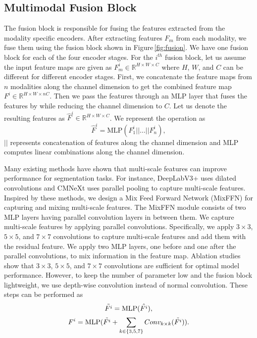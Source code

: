 \documentclass{article}
\begin{document}
\subsection{Multimodal Fusion Block}
The fusion block is responsible for fusing the features extracted from the modality specific encoders. After extracting features $F_{m}$ from each modality, we fuse them using the fusion block shown in Figure\,\ref{fig:fusion}. We have one fusion block for each of the four encoder stages. For the $i^{th}$ fusion block, let us assume the input feature maps are given as $F_m^i \in \mathbb{R}^{H \times W \times C}$ where $H$, $W$, and $C$ can be different for different encoder stages. First, we concatenate the feature maps from $n$ modalities along the channel dimension to get the combined feature map $F^i \in \mathbb{R}^{H \times W \times nC}$. Then we pass the features through an MLP layer that fuses the features by while reducing the channel dimension to $C$. Let us denote the resulting features as $\hat{F}^i \in \mathbb{R}^{H \times W \times C}$. We represent the operation as 
\begin{equation}\label{eq:cat-mlp}
    \hat{F}^i = \text{MLP}(F_1^i || \ldots || F_n^i),
\end{equation}
$||$ represents concatenation of features along the channel dimension and MLP computes linear combinations along the channel dimension. 

Many existing methods have shown that multi-scale features can improve performance for segmentation tasks. For instance, DeepLabV3+ \cite{chen2018deeplabv3+} uses dilated convolutions and CMNeXt \cite{zhang2023CMNext} uses parallel pooling to capture multi-scale features. Inspired by these methods, we design a Mix Feed Forward Network (MixFFN) for capturing and mixing multi-scale features. The MixFFN module consists of two MLP layers having parallel convolution layers in between them. We capture multi-scale features by applying parallel convolutions. Specifically, we apply $3\times 3$, $5\times 5$, and $7\times 7$ convolutions to capture multi-scale features and add them with the residual feature. We apply two MLP layers, one before and one after the parallel convolutions, to mix information in the feature map. Ablation studies show that $3\times 3$, $5\times 5$, and $7\times 7$  convolutions are sufficient for optimal model performance. However, to keep the number of parameter low and the fusion block lightweight, we use depth-wise convolution instead of normal convolution. These steps can be performed as 
\begin{equation}\label{eq:mix-mlp-1}
    \Tilde{F^i} = \text{MLP}(\hat{F^i}), 
\end{equation}
\begin{equation}\label{eq:mix-mlp-2}
    F^i = \text{MLP}(\Tilde{F^i} + \sum_{k \in \{3, 5, 7\}} Conv_{k \times k}(\Tilde{F^i})). 
\end{equation}
\end{document}
